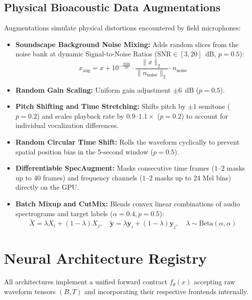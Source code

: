\documentclass[11pt,a4paper]{article}
\begin{document}
\subsection{Physical Bioacoustic Data Augmentations}
Augmentations simulate physical distortions encountered by field microphones:
\begin{itemize}[leftmargin=*]
    \item \textbf{Soundscape Background Noise Mixing:} Adds random slices from the noise bank at dynamic Signal-to-Noise Ratios ($\text{SNR} \in [3, 20]$~dB, $p=0.5$):
    \begin{equation}
        x_{\text{aug}} = x + 10^{-\frac{\text{SNR}}{20}} \cdot \frac{\|x\|_2}{\|n_{\text{noise}}\|_2} \cdot n_{\text{noise}}
    \end{equation}
    \item \textbf{Random Gain Scaling:} Uniform gain adjustment $\pm 6$~dB ($p=0.5$).
    \item \textbf{Pitch Shifting and Time Stretching:} Shifts pitch by $\pm 1$ semitone ($p=0.2$) and scales playback rate by $0.9$--$1.1\times$ ($p=0.2$) to account for individual vocalization differences.
    \item \textbf{Random Circular Time Shift:} Rolls the waveform cyclically to prevent spatial position bias in the 5-second window ($p=0.5$).
    \item \textbf{Differentiable SpecAugment:} Masks consecutive time frames ($1$--$2$ masks up to 40 frames) and frequency channels ($1$--$2$ masks up to 24 Mel bins) directly on the GPU.
    \item \textbf{Batch Mixup and CutMix:} Blends convex linear combinations of audio spectrograms and target labels ($\alpha = 0.4, p=0.5$):
    \begin{equation}
        \tilde{X} = \lambda X_i + (1 - \lambda) X_j, \quad \tilde{\mathbf{y}} = \lambda \mathbf{y}_i + (1 - \lambda) \mathbf{y}_j, \quad \lambda \sim \text{Beta}(\alpha, \alpha)
    \end{equation}
\end{itemize}

\section{Neural Architecture Registry}

All architectures implement a unified forward contract $f_\theta(x)$ accepting raw waveform tensors $(B, T)$ and incorporating their respective frontends internally.
\end{document}
